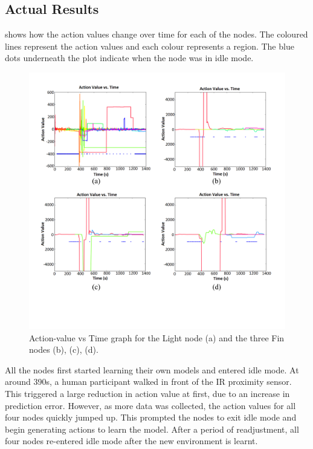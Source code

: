 \subsection{Actual Results}

 shows how the action values change over time for each of the nodes. The coloured lines represent the action values and each colour represents a region. The blue dots underneath the plot indicate when the node was in idle mode.

\begin{figure} [!htbp]
	\centering
	\includegraphics[width=1.0\textwidth]{"fig/validations/Single_Cluster Action Value Vs Time"}
	\caption[Action value vs time graph for the Single Cluster Experiment]{Action-value vs Time graph for the Light node (a) and the three Fin nodes (b), (c), (d).}
	\label{fig:Single_Cluster Action Value Vs Time}
\end{figure}

All the nodes first started learning their own models and entered idle mode. At around 390s, a human participant walked in front of the IR proximity sensor. This triggered a large reduction in action value at first, due to an increase in prediction error. However, as more data was collected, the action values for all four nodes quickly jumped up. This prompted the nodes to exit idle mode and begin generating actions to learn the model. After a period of readjustment, all four nodes re-entered idle mode after the new environment is learnt. 

